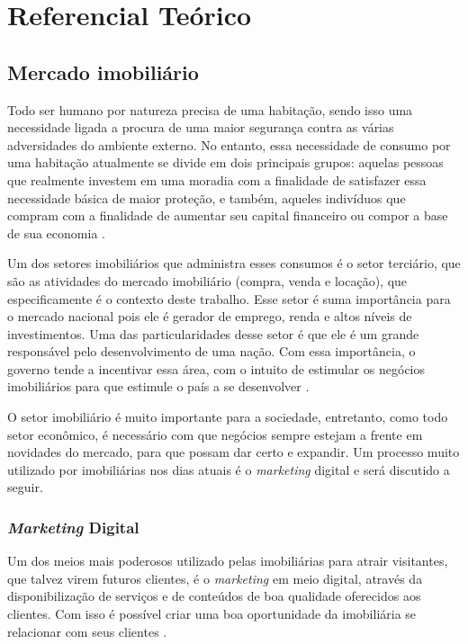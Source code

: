 \chapter{Referencial Teórico}

\section{Mercado imobiliário}

Todo ser humano por natureza precisa de uma habitação, sendo isso uma necessidade ligada a procura de uma maior segurança contra as várias adversidades do ambiente externo. No entanto, essa necessidade de consumo por uma habitação atualmente se divide em dois principais grupos: aquelas pessoas que realmente investem em uma moradia com a finalidade de satisfazer essa necessidade básica de maior proteção, e também, aqueles indivíduos que compram com a finalidade de aumentar seu capital financeiro ou compor a base de sua economia \cite{Arraes:2008}.

Um dos setores imobiliários que administra esses consumos é o setor terciário, que são as atividades do mercado imobiliário (compra, venda e locação), que especificamente é o contexto deste trabalho. Esse setor é suma importância para o mercado nacional pois ele é gerador de emprego, renda e altos níveis de investimentos. Uma das particularidades desse setor é que ele é um grande responsável pelo desenvolvimento de uma nação. Com essa importância, o governo tende a incentivar essa área, com o intuito de estimular os negócios imobiliários para que estimule o país a se desenvolver \cite{Correa:2018}.

O setor imobiliário é muito importante para a sociedade, entretanto, como todo setor econômico, é necessário com que negócios sempre estejam a frente em novidades do mercado, para que possam dar certo e expandir. Um processo muito utilizado por imobiliárias nos dias atuais é o \textit{marketing} digital e será discutido a seguir.

\subsection{\textit{Marketing} Digital}

Um dos meios mais poderosos utilizado pelas imobiliárias para atrair visitantes, que talvez virem futuros clientes, é o \textit{marketing} em meio digital, através da disponibilização de serviços e de conteúdos de boa qualidade oferecidos aos clientes. Com isso é possível criar uma boa oportunidade da imobiliária se relacionar com seus clientes \cite{Barreto:2019}.

